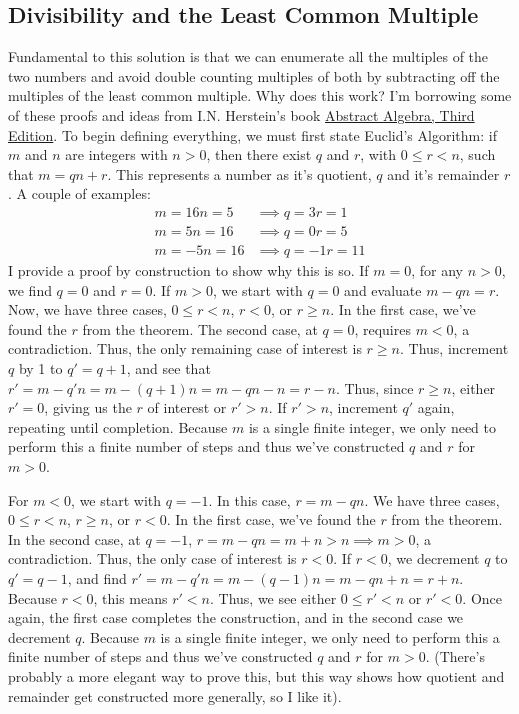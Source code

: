 \documentclass{article}
\begin{document}
\subsection{Divisibility and the Least Common Multiple}
Fundamental to this solution is that we can enumerate all the multiples of the two numbers and avoid double counting multiples of both by subtracting off the multiples of the least common multiple. Why does this work? I'm borrowing some of these proofs and ideas from I.N. Herstein's book \underline{Abstract Algebra, Third Edition}. To begin defining everything, we must first state Euclid's Algorithm: if $m$ and $n$ are integers with $n > 0$, then there exist $q$ and $r$, with $0 \le r < n$, such that $m = qn + r$. This represents a number as it's quotient, $q$ and it's remainder $r$. A couple of examples:
\begin{align*}
	m = 16\!n = 5 &\implies q = 3\!r = 1\\
	m = 5\!n = 16 &\implies q = 0\!r = 5\\
	m = -5\!n = 16 &\implies q = -1\!r = 11
\end{align*}
I provide a proof by construction to show why this is so. If $m = 0$, for any $n >0$, we find $q = 0$ and $r = 0$. If $m > 0$, we start with $q = 0$ and evaluate $m - qn = r$. Now, we have three cases, $0 \le r < n$, $r < 0$, or $r \ge n$. In the first case, we've found the $r$ from the theorem. The second case, at $q = 0$, requires $m < 0$, a contradiction. Thus, the only remaining case of interest is $r \ge n$. Thus, increment $q$ by 1 to $q' = q + 1$, and see that $r' = m - q'n = m - (q + 1)n = m - qn - n = r - n$. Thus, since $r \ge n$, either $r' = 0$, giving us the $r$ of interest or $r' > n$. If $r' > n$, increment $q'$ again, repeating until completion. Because $m$ is a single finite integer, we only need to perform this a finite number of steps and thus we've constructed $q$ and $r$ for $m > 0$.

For $m < 0$, we start with $q = -1$. In this case, $r = m - qn$. We have three cases,  $0 \le r < n$, $r \ge n$, or $r < 0$. In the first case, we've found the $r$ from the theorem. In the second case, at $q = -1$, $r = m - qn = m + n > n\implies m > 0$, a contradiction. Thus, the only case of interest is $r < 0$. If $r < 0$, we decrement $q$ to $q' = q - 1$, and find $r' = m - q'n = m - (q - 1)n = m - qn + n = r + n$. Because $r < 0$, this means $r' < n$. Thus, we see either $0 \le r' < n$ or $r' < 0$. Once again, the first case completes the construction, and in the second case we decrement $q$. Because $m$ is a single finite integer, we only need to perform this a finite number of steps and thus we've constructed $q$ and $r$ for $m > 0$. (There's probably a more elegant way to prove this, but this way shows how quotient and remainder get constructed more generally, so I like it).
\end{document}
